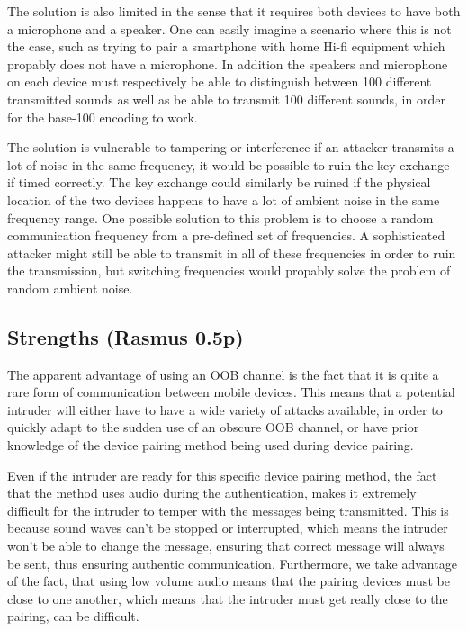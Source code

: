 \documentclass[12pt]{article}
\begin{document}
The solution is also limited in the sense that it requires both devices to have both a microphone and a speaker. One can easily imagine a scenario where this is not the case, such as trying to pair a smartphone with home Hi-fi equipment which propably does not have a microphone. In addition the speakers and microphone on each device must respectively be able to distinguish between 100 different transmitted sounds as well as be able to transmit 100 different sounds, in order for the base-100 encoding to work.

The solution is vulnerable to tampering or interference if an attacker transmits a lot of noise in the same frequency, it would be possible to ruin the key exchange if timed correctly. The key exchange could similarly be ruined if the physical location of the two devices happens to have a lot of ambient noise in the same frequency range.
One possible solution to this problem is to choose a random communication frequency from a pre-defined set of frequencies. A sophisticated attacker might still be able to transmit in all of these frequencies in order to ruin the transmission, but switching frequencies would propably solve the problem of random ambient noise.

\newpage

\subsection{Strengths (Rasmus 0.5p)}
\label{sub:Strengths}

The apparent advantage of using an OOB channel is the fact that it is quite a rare form of communication between mobile devices. This means that a potential intruder will either have to have a wide variety of attacks available, in order to quickly adapt to the sudden use of an obscure OOB channel, or have prior knowledge of the device pairing method being used during device pairing.

Even if the intruder are ready for this specific device pairing method, the fact that the method uses audio during the authentication, makes it extremely difficult for the intruder to temper with the messages being transmitted. This is because sound waves can't be stopped or interrupted, which means the intruder won't be able to change the message, ensuring that correct message will always be sent, thus ensuring authentic communication. Furthermore, we take advantage of the fact, that using low volume audio means that the pairing devices must be close to one another, which means that the intruder must get really close to the pairing, can be difficult.
\end{document}
